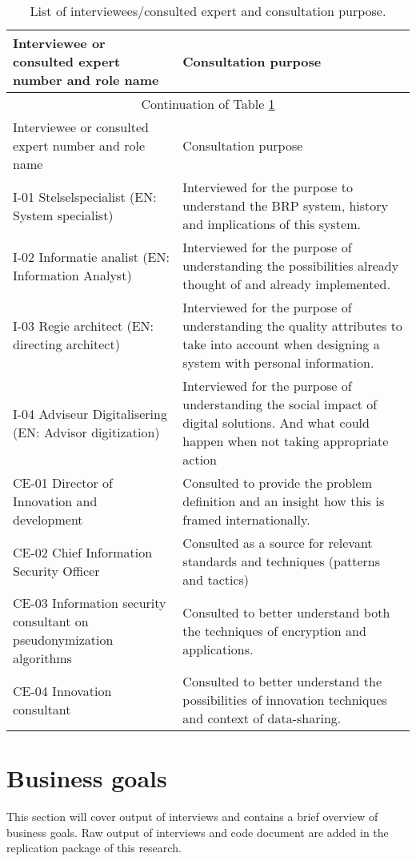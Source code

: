 \begin{longtable}[c]{|p{6cm}|p{9cm}|}
 \caption{List of interviewees/consulted expert and consultation purpose.\label{tab:interviewees}}\\
 \hline
 Interviewee or consulted expert number and role name & Consultation purpose\\
 \hline
 \endfirsthead

 \hline
 \multicolumn{2}{|c|}{Continuation of Table \ref{tab:interviewees}}\\
 \hline
 Interviewee or consulted expert number and role name & Consultation purpose\\
 \hline
 \endhead

 \hline
 \endfoot

 \hline\hline
 \endlastfoot
 I-01 Stelselspecialist (EN: System specialist)   & Interviewed for the purpose to understand the BRP system, history and implications of this system. \\
 \hline
 I-02 Informatie analist (EN: Information Analyst) & Interviewed for the purpose of understanding the possibilities already thought of and already implemented.  \\
 \hline
 I-03 Regie architect (EN: directing architect) & Interviewed for the purpose of understanding the quality attributes to take into account when designing a system with personal information.\\
 \hline
 I-04 Adviseur Digitalisering (EN: Advisor digitization) & Interviewed for the purpose of understanding the social impact of digital solutions. And what could happen when not taking appropriate action\\
 \hline
 CE-01 Director of Innovation and development & Consulted to provide the problem definition and an insight how this is framed internationally. \\
 \hline
 CE-02 Chief Information Security Officer & Consulted as a source for relevant standards and techniques (patterns and tactics)\\
 \hline
 CE-03 Information security consultant on pseudonymization algorithms & Consulted to better understand both the techniques of encryption and applications. \\
 \hline
 CE-04 Innovation consultant & Consulted to better understand the possibilities of innovation techniques and context of data-sharing.\\
  \hline
\end{longtable}

\chapter{Business goals} \label{Appendix B} %
This section will cover output of interviews and contains a brief overview of business goals. Raw output of interviews and code document are added in the replication package of this research.



